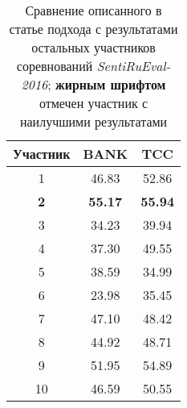 \begin{table}[htp!]
\centering
\caption{Сравнение описанного в статье подхода с результатами остальных
    участников соревнований {\it SentiRuEval-2016}; {\bf жирным шрифтом}
    отмечен участник с наилучшими результатами}
\label{table:comparison}
\begin{tabular}{ccc}
\hline
Участник   & BANK           & TCC             \\ \hline
1          & 46.83          & 52.86           \\
\textbf{2} & \textbf{55.17} & \textbf{55.94}  \\
3          & 34.23          & 39.94           \\
4          & 37.30          & 49.55           \\
5          & 38.59          & 34.99           \\
6          & 23.98          & 35.45           \\
7          & 47.10          & 48.42           \\
8          & 44.92          & 48.71           \\
9          & 51.95          & 54.89           \\
10         & 46.59          & 50.55           \\ \hline
\end{tabular}
\end{table}

